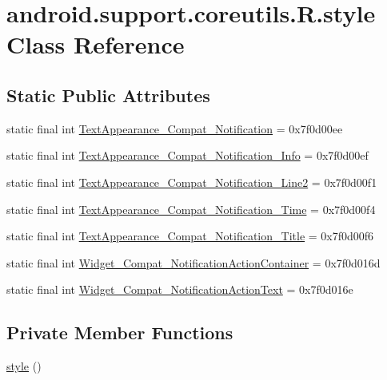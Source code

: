 \hypertarget{classandroid_1_1support_1_1coreutils_1_1_r_1_1style}{}\section{android.\+support.\+coreutils.\+R.\+style Class Reference}
\label{classandroid_1_1support_1_1coreutils_1_1_r_1_1style}
\subsection*{Static Public Attributes}
\begin{DoxyCompactItemize}
\item 
static final int \mbox{\hyperlink{classandroid_1_1support_1_1coreutils_1_1_r_1_1style_ae4820cdb0f0f4de3aa8afc1087767854}{Text\+Appearance\+\_\+\+Compat\+\_\+\+Notification}} = 0x7f0d00ee
\item 
static final int \mbox{\hyperlink{classandroid_1_1support_1_1coreutils_1_1_r_1_1style_a1ba61728862fe706cb77cda66c930df9}{Text\+Appearance\+\_\+\+Compat\+\_\+\+Notification\+\_\+\+Info}} = 0x7f0d00ef
\item 
static final int \mbox{\hyperlink{classandroid_1_1support_1_1coreutils_1_1_r_1_1style_a02a4f99f910a1f530fde40720bde5afe}{Text\+Appearance\+\_\+\+Compat\+\_\+\+Notification\+\_\+\+Line2}} = 0x7f0d00f1
\item 
static final int \mbox{\hyperlink{classandroid_1_1support_1_1coreutils_1_1_r_1_1style_a725275630f27491b0eb990f533b28990}{Text\+Appearance\+\_\+\+Compat\+\_\+\+Notification\+\_\+\+Time}} = 0x7f0d00f4
\item 
static final int \mbox{\hyperlink{classandroid_1_1support_1_1coreutils_1_1_r_1_1style_a619695923ae29ca0adff63e8b9e6c5ca}{Text\+Appearance\+\_\+\+Compat\+\_\+\+Notification\+\_\+\+Title}} = 0x7f0d00f6
\item 
static final int \mbox{\hyperlink{classandroid_1_1support_1_1coreutils_1_1_r_1_1style_ac2adbd575145c1834e20adaf6344014b}{Widget\+\_\+\+Compat\+\_\+\+Notification\+Action\+Container}} = 0x7f0d016d
\item 
static final int \mbox{\hyperlink{classandroid_1_1support_1_1coreutils_1_1_r_1_1style_afecf35538e16fa5d87a95f377bcd856d}{Widget\+\_\+\+Compat\+\_\+\+Notification\+Action\+Text}} = 0x7f0d016e
\end{DoxyCompactItemize}
\subsection*{Private Member Functions}
\begin{DoxyCompactItemize}
\item 
\mbox{\hyperlink{classandroid_1_1support_1_1coreutils_1_1_r_1_1style_a18e68ea1de10061e26452ce37ef8debc}{style}} ()
\end{DoxyCompactItemize}


